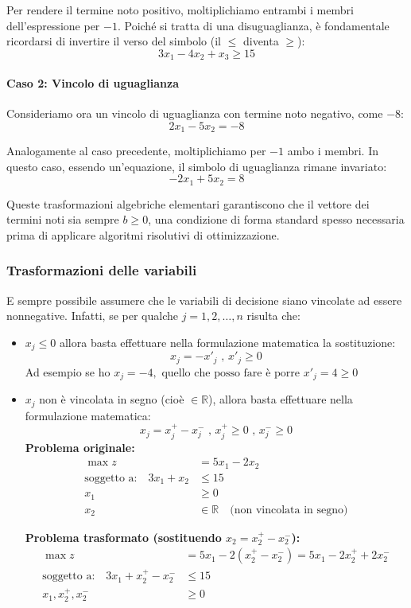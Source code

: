 Per rendere il termine noto positivo, moltiplichiamo entrambi i membri dell'espressione per $-1$. Poiché si tratta di una disuguaglianza, è fondamentale ricordarsi di invertire il verso del simbolo (il $\le$ diventa $\ge$):
$$ 3x_1 - 4x_2 + x_3 \ge 15 $$

\paragraph{Caso 2: Vincolo di uguaglianza}
Consideriamo ora un vincolo di uguaglianza con termine noto negativo, come $-8$:
$$ 2x_1 - 5x_2 = -8 $$

Analogamente al caso precedente, moltiplichiamo per $-1$ ambo i membri. In questo caso, essendo un'equazione, il simbolo di uguaglianza rimane invariato:
$$ -2x_1 + 5x_2 = 8 $$

Queste trasformazioni algebriche elementari garantiscono che il vettore dei termini noti sia sempre $b \ge 0$, una condizione di forma standard spesso necessaria prima di applicare algoritmi risolutivi di ottimizzazione.

\subsubsection{Trasformazioni delle variabili}
E sempre possibile assumere che le variabili di decisione siano vincolate ad
essere nonnegative. Infatti, se per qualche $j = 1,2,\dots,n$ risulta che:
\begin{itemize}
    \item $x_j \leq 0$ allora basta effettuare nella formulazione matematica la sostituzione:
    \begin{equation}
        x_j = -x'_j \text{ , } x'_j \geq 0
    \end{equation}
    Ad esempio se ho $x_j = -4, \text{ quello che posso fare è porre } x'_j = 4 \geq 0 $
    \item $x_j$ non è vincolata in segno (cioè $\in \mathbb{R}$), allora basta effettuare nella formulazione matematica:
    \begin{equation}
        x_j = x_j ^+ - x_j ^- \text{ , } x_j ^+ \geq 0 \text{ , }  x_j ^- \geq 0
    \end{equation}
    \textbf{Problema originale:}
    \begin{align*}
    \max z &= 5x_1 - 2x_2 \\
    \text{soggetto a:} \quad 3x_1 + x_2 &\le 15 \\
    x_1 &\ge 0 \\
    x_2 &\in \mathbb{R} \quad \text{(non vincolata in segno)}
    \end{align*}

    \textbf{Problema trasformato (sostituendo $x_2 = x_2^+ - x_2^-$):}
    \begin{align*}
    \max z &= 5x_1 - 2(x_2^+ - x_2^-) = 5x_1 - 2x_2^+ + 2x_2^- \\
    \text{soggetto a:} \quad 3x_1 + x_2^+ - x_2^- &\le 15 \\
    x_1, x_2^+, x_2^- &\ge 0
    \end{align*}
\end{itemize}
